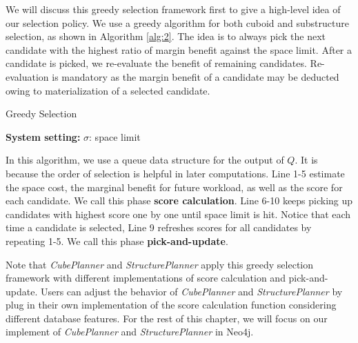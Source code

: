 	We will discuss this greedy selection framework first to give a high-level idea of our selection policy. We use a greedy algorithm for both cuboid and substructure selection, as shown in Algorithm \ref{alg:2}. The idea is to always pick the next candidate with the highest ratio of margin benefit against the space limit. After a candidate is picked, we re-evaluate the benefit of remaining candidates. Re-evaluation is mandatory as the margin benefit of a candidate may be deducted owing to materialization of a selected candidate. 
	
	
	\begin{algorithm}[H]
		\label{alg:2}
		\caption{Greedy Selection}
		\LinesNumbered  
		\textbf{System setting:} $\sigma$: space limit\\ 
		
	\end{algorithm}
	
	In this algorithm, we use a queue data structure for the output of $Q$. It is because the order of selection is helpful in later computations. %
	Line 1-5 estimate the space cost, the marginal benefit for future workload, as well as the score for each candidate. We call this phase  \textbf{score calculation}. Line 6-10 keeps picking up candidates with highest score one by one until space limit is hit. Notice that each time a candidate is selected, Line 9 refreshes scores for all candidates by repeating 1-5. We call this phase \textbf{pick-and-update}.   
	
	Note that \emph{CubePlanner} and \emph{StructurePlanner} apply this greedy selection framework with different implementations of score calculation and pick-and-update. Users can adjust the behavior of \emph{CubePlanner} and \emph{StructurePlanner} by plug in their own implementation of the score calculation function considering different database features. For the rest of this chapter, we will focus on our implement of  \emph{CubePlanner} and \emph{StructurePlanner} in Neo4j.
	
